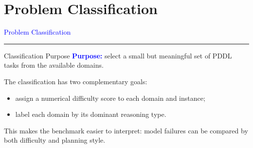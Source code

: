 \documentclass{beamer}
\begin{document}
\section{Problem Classification}
\begin{frame}[c]
    \centering
    
    {\Huge\textcolor{blue}{Problem Classification}}
    
    \vspace{0.1cm} %
    
    \textcolor{black}{\rule{10cm}{1pt}}
    
\end{frame}

\begin{frame}{Classification Purpose}\footnotesize
    \textcolor{blue}{\textbf{Purpose:}} select a small but meaningful set of PDDL tasks from the available domains.

    \vspace{0.35cm}
    The classification has two complementary goals:
    \begin{itemize}
        \item assign a numerical difficulty score to each domain and instance;
        \item label each domain by its dominant reasoning type.
    \end{itemize}

    \vspace{0.25cm}
    This makes the benchmark easier to interpret: model failures can be compared by both difficulty and planning style.
\end{frame}
\end{document}
